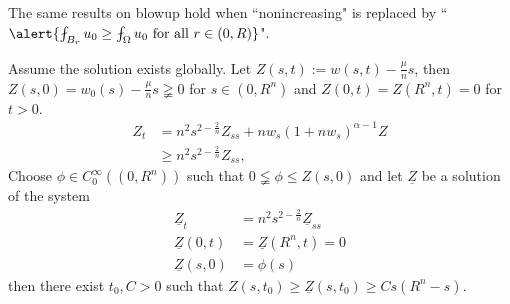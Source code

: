 \begin{frame}
The same results on blowup hold when ``nonincreasing" is replaced by ``$\alert{\fint_{B_r}u_0\geq \fint_{\Omega}u_0 \text{ for all } r\in(0, R)}$". 

Assume the solution exists globally. Let $Z(s,t) := w(s,t) - \frac{\mu}{n}s$, then $Z(s,0)= w_0(s) - \frac{\mu}{n}s\gneqq 0$ for $s\in(0, R^n)$ and $Z(0, t) = Z(R^n, t) = 0$ for $t>0$.
\begin{align*}
    Z_t &= n^2s^{2-\frac2n}Z_{ss} + nw_s(1+nw_s)^{\alpha -1}Z\\
    &\geq n^2s^{2-\frac2n}Z_{ss},
\end{align*} 
Choose $\phi\in C_0^{\infty}((0,R^n))$ such that $0\lneqq \phi\leq Z(s, 0)$ and let $\underline{Z}$ be a solution of the system
\begin{align*}
    \underline{Z}_t &= n^2s^{2-\frac2n}\underline{Z}_{ss}\\
    \underline{Z}(0, t) &= \underline{Z}(R^n, t) = 0\\
    \underline{Z}(s, 0) &= \phi(s) 
\end{align*}
 then there exist $t_0, C>0$ such that $Z(s,t_0)\geq \underline{Z}(s, t_0)\geq Cs(R^n-s)$.
\end{frame}









